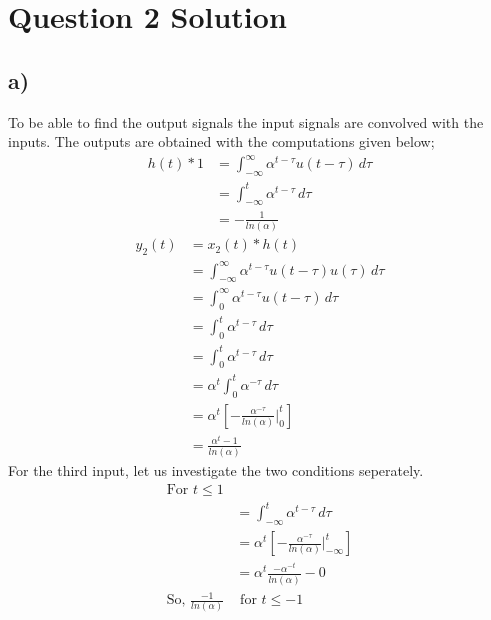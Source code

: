 \documentclass[letterpaper,12pt]{article}
\begin{document}
\section{Question 2 Solution}
\subsection{a)}
To be able to find the output signals the input signals are convolved with the inputs. The outputs are obtained with the computations given below;
\begin{equation}
    \begin{split}
        h(t) \ast 1 &= \int_{-\infty}^{\infty} \alpha^{t-\tau} u(t-\tau)  \,d\tau \\
        &=   \int_{-\infty}^{t} \alpha^{t-\tau}  \,d\tau \\
        &=  - \frac{1}{ln(\alpha)}
    \end{split}
\end{equation}
\begin{equation}
    \begin{split}
        y_2(t) &= x_2(t) \ast h(t)\\
        &= \int_{-\infty}^{\infty} \alpha^{t-\tau} u(t-\tau) u(\tau) \,d\tau \\
        &= \int_{0}^{\infty} \alpha^{t-\tau} u(t-\tau)  \,d\tau \\
        &= \int_{0}^{t} \alpha^{t-\tau} \,d\tau \\
        &= \int_{0}^{t} \alpha^{t-\tau} \,d\tau \\
        &= \alpha^t \int_{0}^{t} \alpha^{-\tau} \,d\tau\\
        &= \alpha^t [- \frac{\alpha^{-\tau}}{ln(\alpha)} |_0^t]\\
        &= \frac{\alpha^t -1 }{ln(\alpha)}
    \end{split}
\end{equation}
For the third input, let us investigate the two conditions seperately. 
\begin{equation}
    \begin{split}
        \text{For }t \leq 1&  \\
        &=   \int_{-\infty}^{t} \alpha^{t-\tau}  \,d\tau \\
        &= \alpha^t [- \frac{\alpha^{-\tau}}{ln(\alpha)} |_{-\infty}^t]\\
        &= \alpha^t \frac{-\alpha^{-t}}{ln(\alpha)}-0 \\
        \text{So, } \frac{-1}{ln(\alpha)} &\text{ for } t \leq -1 
    \end{split}
\end{equation}
\end{document}
